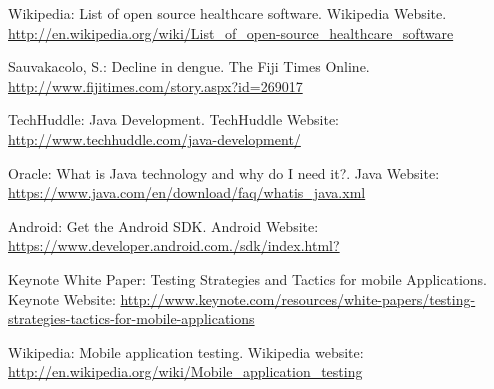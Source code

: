 \documentclass[runningheads,a4paper]{llncs}
\begin{document}
\begin{thebibliography}{4}
 Wikipedia: List of open source healthcare software. Wikipedia Website. 
\url{http://en.wikipedia.org/wiki/List_of_open-source_healthcare_software}

 Sauvakacolo, S.: Decline in dengue. The Fiji Times Online. 
\url{http://www.fijitimes.com/story.aspx?id=269017}

 TechHuddle: Java Development. TechHuddle Website: 
\url{http://www.techhuddle.com/java-development/}

 Oracle: What is Java technology and why do I need it?. Java Website:
\url{https://www.java.com/en/download/faq/whatis_java.xml}

 Android: Get the Android SDK. Android Website: 
\url{https://www.developer.android.com./sdk/index.html?}

 Keynote White Paper: Testing Strategies and Tactics for mobile Applications. Keynote Website:
\url{http://www.keynote.com/resources/white-papers/testing-strategies-tactics-for-mobile-applications}

 Wikipedia: Mobile application testing. Wikipedia website:
\url{http://en.wikipedia.org/wiki/Mobile_application_testing}

\end{thebibliography}
\end{document}
